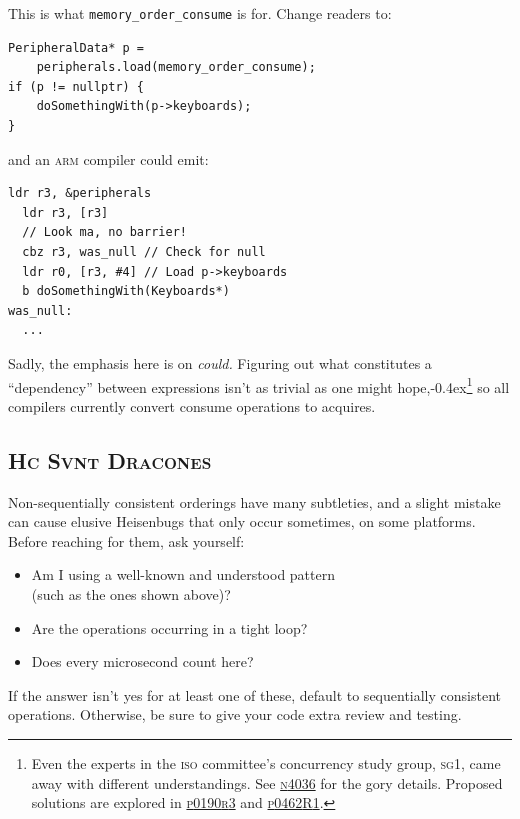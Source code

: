 \documentclass[fontsize=10pt, numbers=endperiod]{scrartcl}
\newcommand{\codesize}{\fontsize{10pt}{12pt}}
\newcommand{\punckern}{\kern-0.4ex}
\newcommand{\monobox}[1]{\mbox{\texttt{#1}}}
\newenvironment{colfigure}
  {\par\vspace{1\baselineskip minus 0.5\baselineskip}\noindent\minipage{\linewidth}}
  {\endminipage\vspace*{1\baselineskip minus 0.7\baselineskip}}
\begin{document}
\begin{multicols*}{2}
This is what \monobox{memory\_order\_consume} is for.
Change readers to:
\begin{colfigure}
\begin{verbatim}
PeripheralData* p =
    peripherals.load(memory_order_consume);
if (p != nullptr) {
    doSomethingWith(p->keyboards);
}
\end{verbatim}
\end{colfigure}
and an \textsc{arm} compiler could emit:
\begin{colfigure}
\begin{lstlisting}[language={[ARM]Assembler}]
  ldr r3, &peripherals
  ldr r3, [r3]
  // Look ma, no barrier!
  cbz r3, was_null // Check for null
  ldr r0, [r3, #4] // Load p->keyboards
  b doSomethingWith(Keyboards*)
was_null:
  ...
\end{lstlisting}
\end{colfigure}
Sadly, the emphasis here is on \emph{could.}
Figuring out what constitutes a ``dependency'' between expressions isn't
as trivial as one might hope,\punckern\footnote{Even the experts in
the \textsc{iso} committee's concurrency study group, \textsc{sg}1,
came away with different understandings.
See
\href{http://www.open-std.org/jtc1/sc22/wg21/docs/papers/2014/n4036.pdf}{\textsc{n}4036}
for the gory details.
Proposed solutions are explored in
\href{http://www.open-std.org/jtc1/sc22/wg21/docs/papers/2017/p0190r3.pdf}{\textsc{p}0190\textsc{r}3}
and
\href{http://www.open-std.org/jtc1/sc22/wg21/docs/papers/2017/p0462r1.pdf}{\textsc{p}0462\textsc{R}1}.
}
so all compilers currently convert consume operations to acquires.

\subsection{\textsc{Hc Svnt Dracones}}

Non-sequentially consistent orderings have many subtleties,
and a slight mistake can cause elusive Heisenbugs that only occur sometimes,
on some platforms.
Before reaching for them, ask yourself:
\begin{itemize}[label={}, before=\itshape]
\item Am I using a well-known and understood pattern \\
      (such as the ones shown above)?
\item Are the operations occurring in a tight loop?
\item Does every microsecond count here?
\end{itemize}
If the answer isn't yes for at least one of these,
default to sequentially consistent operations.
Otherwise, be sure to give your code extra review and testing.


\end{multicols*}
\end{document}
